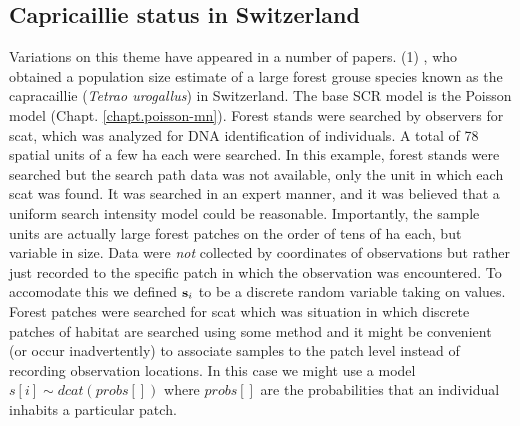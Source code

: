 \subsection{Capricaillie status in Switzerland}

Variations on this theme have appeared in a number of papers.  (1)
\citet{mollet_etal:2012}, who obtained a population size estimate of a
large forest grouse species known as the capracaillie ({\it Tetrao
  urogallus}) in Switzerland.  The base SCR model is the Poisson model
(Chapt. \ref{chapt.poisson-mn}). Forest stands were searched by
observers for scat, which was analyzed for DNA identification of
individuals.  A total of 78 spatial units of a few ha each were
searched.  In this example, forest stands were searched but the search
path data was not available, only the unit in which each scat was
found.  It was searched in an expert manner, and it was believed that
a uniform search intensity model could be reasonable.  Importantly,
the sample units are actually large forest patches on the order of
tens of ha each, but variable in size. Data were {\it not} collected
by coordinates of observations but rather just recorded to the
specific patch in which the observation was encountered. To accomodate
this we defined ${\bf s}_{i}$ to be a discrete random variable taking
on values.  Forest patches were searched for scat which was situation
in which discrete patches of habitat are searched using some method
and it might be convenient (or occur inadvertently) to associate
samples to the patch level instead of recording observation
locations. In this case we might use a model $s[i] \sim dcat(probs[])$
where $probs[]$ are the probabilities that an individual inhabits a
particular patch.

